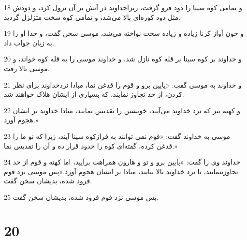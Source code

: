 \par 18 و تمامی کوه سینا را دود فرو گرفت، زیراخداوند در آتش بر آن نزول کرد، و دودش مثل دود کوره‌ای بالا می‌شد، و تمامی کوه سخت متزلزل گردید.
\par 19 و چون آواز کرنا زیاده و زیاده سخت نواخته می‌شد، موسی سخن گفت، و خدا او را به زبان جواب داد.
\par 20 و خداوند بر کوه سینا بر قله کوه نازل شد، و خداوند موسی را به قله کوه خواند، و موسی بالا رفت.
\par 21 و خداوند به موسی گفت: «پایین برو و قوم را قدغن نما، مبادا نزدخداوند برای نظر کردن، از حد تجاوز نمایند، که بسیاری از ایشان هلاک خواهند شد.
\par 22 و کهنه نیز که نزد خداوند می‌آیند، خویشتن را تقدیس نمایند، مبادا خداوند بر ایشان هجوم آورد.»
\par 23 موسی به خداوند گفت: «قوم نمی توانند به فرازکوه سینا آیند، زیرا که تو ما را قدغن کرده، گفته‌ای کوه را حدود قرار ده و آن را تقدیس نما.»
\par 24 خداوند وی را گفت: «پایین برو و تو و هارون همراهت برآیید، اما کهنه و قوم از حد تجاوزننمایند، تا نزد خداوند بالا بیایند، مبادا بر ایشان هجوم آورد.»پس موسی نزد قوم فرود شده، بدیشان سخن گفت.
\par 25 پس موسی نزد قوم فرود شده، بدیشان سخن گفت.
 
\chapter{20}

